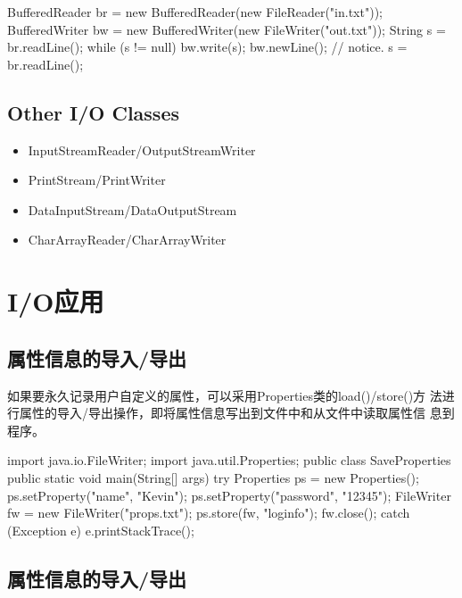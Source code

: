 
\begin{javaCode}
  BufferedReader br = new BufferedReader(new FileReader("in.txt"));
  BufferedWriter bw = new BufferedWriter(new FileWriter("out.txt"));
  String s = br.readLine();
  while (s != null) {
    bw.write(s);
    bw.newLine(); // notice.
    s = br.readLine();
  }
\end{javaCode}

\subsection{Other I/O Classes}
\begin{itemize}
\item InputStreamReader/OutputStreamWriter
\item PrintStream/PrintWriter
\item DataInputStream/DataOutputStream
\item CharArrayReader/CharArrayWriter
\end{itemize}

\section{I/O应用}

\subsection{属性信息的导入/导出}

如果要永久记录用户自定义的属性，可以采用Properties类的load()/store()方
法进行属性的导入/导出操作，即将属性信息写出到文件中和从文件中读取属性信
息到程序。


\begin{javaCode}
  import java.io.FileWriter;
  import java.util.Properties;
  public class SaveProperties {
    public static void main(String[] args) {
      try {
        Properties ps = new Properties();
        ps.setProperty("name", "Kevin");
        ps.setProperty("password", "12345");
        FileWriter fw = new FileWriter("props.txt");
        ps.store(fw, "loginfo");
        fw.close();
      } catch (Exception e) {
        e.printStackTrace();
      }
    }
  }
\end{javaCode}

\subsection{属性信息的导入/导出}

